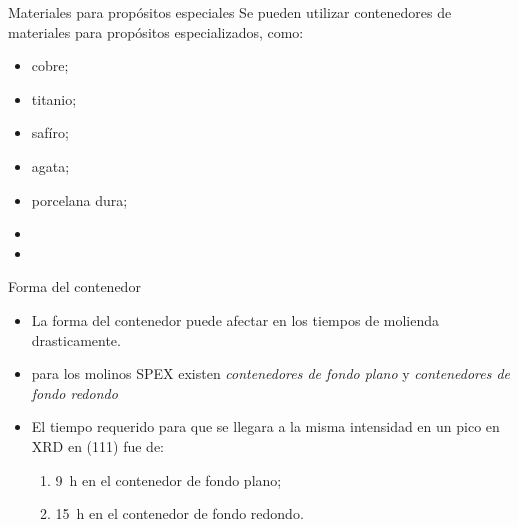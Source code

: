 \documentclass[%
spanish,
    progressbar=head,
background=dark,
subsectionpage
]{beamer}
\begin{document}
\begin{frame}{Materiales para propósitos especiales}
    Se pueden utilizar contenedores de materiales para propósitos especializados, como:
    \begin{itemize}
        \item cobre;
        \item titanio;
        \item safíro;
        \item agata;
        \item porcelana dura;
        \item {}
        \item {}
    \end{itemize}
\end{frame}

\begin{frame}{Forma del contenedor}
\begin{itemize}
    \item La forma del contenedor puede afectar en los tiempos de molienda drasticamente.
    \item para los molinos SPEX existen \emph{contenedores de fondo plano} y \emph{contenedores de fondo redondo}
    \item El tiempo requerido para que se llegara a la misma intensidad en un pico en XRD en (111) fue de:
    \begin{enumerate}
        \item \qty{9}{\hour} en el contenedor de fondo plano;
        \item \qty{15}{\hour} en el contenedor de fondo redondo.
    \end{enumerate}
\end{itemize}
\end{frame}
\end{document}
